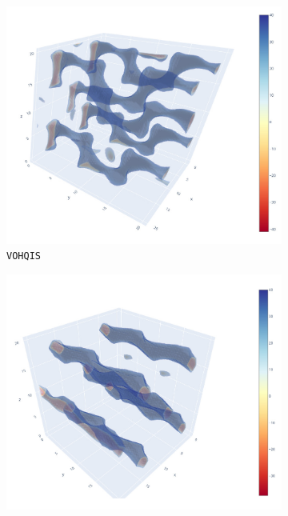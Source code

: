 \documentclass[main]{subfiles}
\begin{document}
\begin{figure}[ht]
  \centering
  \begin{subfigure}[b]{0.32\textwidth}
      \centering
      \includegraphics[width=\textwidth]{figures/5-diffusion/viz/VOHQIS.jpg}
      \caption{\texttt{VOHQIS}~\cite{Wragg_2001}}\label{fgr:zigzag_a}
  \end{subfigure}
  \hfill
  \begin{subfigure}[b]{0.32\textwidth}
      \centering
      \includegraphics[width=\textwidth]{figures/5-diffusion/viz/GUMDEZ.jpg}

\end{subfigure}
\end{figure}
\end{document}
